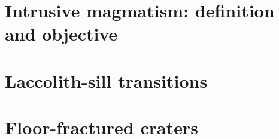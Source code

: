 \documentclass[a4paper,12pt,twoside]{ThesisStyle}
\begin{document}


\dominitoc


\cleardoublepage



\cleardoublepage

\tableofcontents

\mainmatter

\setcounter{chapter}{-1}
\pagestyle{empty}


\part{Intrusive magmatism: definition and objective}
\pagestyle{fancy}




\part{Laccolith-sill transitions}




\part{Floor-fractured craters}




% 



% 
% 

% 



\end{document}
